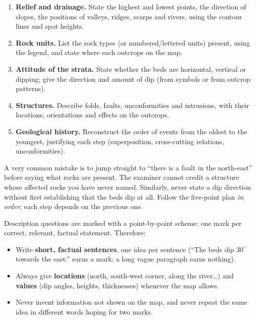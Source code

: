 \documentclass[11pt]{article}
\begin{document}
\begin{methode}
\begin{enumerate}
\item \textbf{Relief and drainage.} State the highest and lowest points, the direction of slopes, the positions of valleys, ridges, scarps and rivers, using the contour lines and spot heights.
\item \textbf{Rock units.} List the rock types (or numbered/lettered units) present, using the legend, and state where each outcrops on the map.
\item \textbf{Attitude of the strata.} State whether the beds are horizontal, vertical or dipping; give the direction and amount of dip (from symbols or from outcrop patterns).
\item \textbf{Structures.} Describe folds, faults, unconformities and intrusions, with their locations, orientations and effects on the outcrops.
\item \textbf{Geological history.} Reconstruct the order of events from the oldest to the youngest, justifying each step (superposition, cross-cutting relations, unconformities).
\end{enumerate}
\end{methode}

\begin{attention}
A very common mistake is to jump straight to ``there is a fault in the north-east'' before saying what rocks are present. The examiner cannot credit a structure whose affected rocks you have never named. Similarly, never state a dip direction without first establishing that the beds dip at all. Follow the five-point plan \emph{in order}; each step depends on the previous one.
\end{attention}

\begin{attention}
Description questions are marked with a point-by-point scheme: one mark per correct, relevant, factual statement. Therefore:
\begin{itemize}
\item Write \textbf{short, factual sentences}, one idea per sentence (``The beds dip $30^\circ$ towards the east.'' earns a mark; a long vague paragraph earns nothing).
\item Always give \textbf{locations} (north, south-west corner, along the river\ldots) and \textbf{values} (dip angles, heights, thicknesses) whenever the map allows.
\item Never invent information not shown on the map, and never repeat the same idea in different words hoping for two marks.
\end{itemize}
\end{attention}
\end{document}
